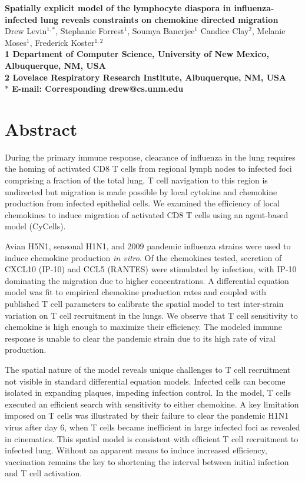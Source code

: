 \documentclass[10pt]{article}
\date{}
\begin{document}
\begin{flushleft}
{\Large
\textbf{Spatially explicit model of the lymphocyte diaspora in influenza-infected lung reveals constraints on chemokine directed migration}
}
\\
Drew Levin$^{1,\ast}$, 
Stephanie Forrest$^{1}$, 
Soumya Banerjee$^{1}$
Candice Clay$^{2}$, 
Melanie Moses$^{1}$, 
Frederick Koster$^{1,2}$
\\
\bf{1} Department of Computer Science, University of New Mexico, Albuquerque, NM, USA
\\
\bf{2} Lovelace Respiratory Research Institute, Albuquerque, NM, USA
\\
$\ast$ E-mail: Corresponding drew@cs.unm.edu
\end{flushleft}



\section*{Abstract}

During the primary immune response, clearance of influenza in the lung requires the homing of activated CD8 T cells from regional lymph nodes to infected foci comprising a fraction of the total lung.  T cell navigation to this region is undirected but migration is made possible by local cytokine and chemokine production from infected epithelial cells.  We examined the efficiency of local chemokines to induce migration of activated CD8 T cells using an agent-based model (CyCells).  

Avian H5N1, seasonal H1N1, and 2009 pandemic influenza strains were used to induce chemokine production \textit{in vitro}.  Of the chemokines tested, secretion of CXCL10 (IP-10) and CCL5 (RANTES) were stimulated by infection, with IP-10 dominating the migration due to higher concentrations.  A differential equation model was fit to empirical chemokine production rates and coupled with published T cell parameters to calibrate the spatial model to test inter-strain variation on T cell recruitment in the lungs.  We observe that T cell sensitivity to chemokine is high enough to maximize their efficiency.  The modeled immune response is unable to clear the pandemic strain due to its high rate of viral production.  

The spatial nature of the model reveals unique challenges to T cell recruitment not visible in standard differential equation models.  Infected cells can become isolated in expanding plaques, impeding infection control.  In the model, T cells executed an efficient search with sensitivity to either chemokine.  A key limitation imposed on T cells was illustrated by their failure to clear the pandemic H1N1 virus after day 6, when T cells became inefficient in large infected foci as revealed in cinematics. This spatial model is consistent with efficient T cell recruitment to infected lung.  Without an apparent means to induce increased efficiency, vaccination remains the key to shortening the interval between initial infection and T cell activation.
\end{document}

